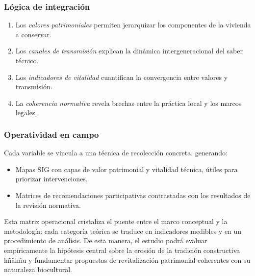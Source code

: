 
\subsubsection{Lógica de integración}

\begin{enumerate}
	\item Los \emph{valores patrimoniales} permiten jerarquizar los
	      componentes de la vivienda a conservar.
	\item Los \emph{canales de transmisión} explican la dinámica
	      intergeneracional del saber técnico.
	\item Los \emph{indicadores de vitalidad} cuantifican la convergencia
	      entre valores y transmisión.
	\item La \emph{coherencia normativa} revela brechas entre la práctica
	      local y los marcos legales.
\end{enumerate}

\subsubsection{Operatividad en campo}

Cada variable se vincula a una técnica de recolección concreta, generando:

\begin{itemize}
	\item Mapas SIG con capas de valor patrimonial y vitalidad técnica,
	      útiles para priorizar intervenciones.
	\item Matrices de recomendaciones participativas contrastadas con los
	      resultados de la revisión normativa.
\end{itemize}

Esta matriz operacional cristaliza el puente entre el marco conceptual
y la metodología: cada categoría teórica se traduce en indicadores
medibles y en un procedimiento de análisis.  De esta manera, el estudio
podrá evaluar empíricamente la hipótesis central sobre la erosión de la
tradición constructiva hñähñu y fundamentar propuestas de revitalización
patrimonial coherentes con su naturaleza biocultural.
